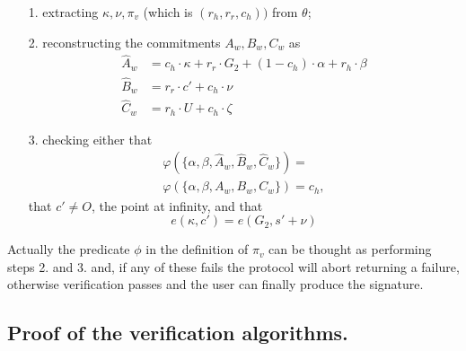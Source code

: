 \documentclass[twocolumn]{article}
\begin{document}
\begin{itemize}
    \item[1.] extracting $\kappa, \nu, \pi_v$ (which is $(r_h,r_r, c_h))$ from $\theta$;
    \item[2.] reconstructing the commitments $A_w, B_w, C_w$ as
    \begin{align*}
        \widehat{A}_w &= c_h\cdot \kappa + r_r\cdot G_2 + (1 - c_h) \cdot\alpha + r_h \cdot \beta \\
        \widehat{B}_w &= r_r\cdot c' + c_h\cdot \nu \\
        \widehat{C}_w &= r_h\cdot U + c_h\cdot \zeta
    \end{align*}
    \item[3.] checking either that
    \begin{multline}\label{challenge pi_v}  \varphi(\{\alpha,\beta,\widehat{A}_w,\widehat{B}_w,\widehat{C}_w\}) = \\ \varphi(\{\alpha,\beta,A_w,B_w,C_w\}) = c_h,
    \end{multline}
    that $c' \ne O$, the point at infinity, and that
    \begin{equation}\label{miller}
    e(\kappa, c') = e(G_2, s' + \nu)
    \end{equation}
    \end{itemize}
Actually the predicate $\phi$ in the definition of $\pi_v$ can be thought as performing steps 2. and 3. and, if any of these fails the protocol will abort returning a failure, otherwise verification passes and the user can finally produce the signature.

\subsection*{Proof of the verification algorithms.}
\end{document}
